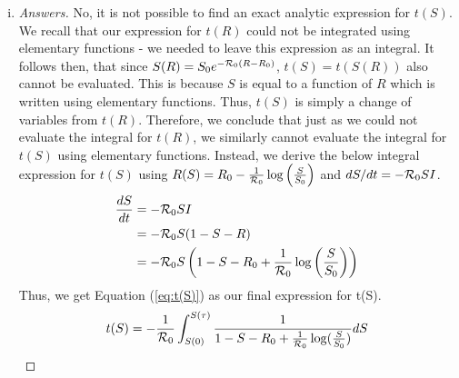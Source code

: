 \documentclass[12pt]{article}
\begin{document}
\begin{enumerate}[(a)]
\begin{enumerate}[(i)]
{\begin{proof}[Answers]
\\\\
We would not incorporate this expression in a report for a public health agency because of some key assumptions in the model that do not reflect the nature of an influenza epidemic. In particular, the temporal delay between prevalence and death is a factor we would expect to have a large impact on the inference of the time peak prevalence from mortality data, and the lack of heterogeneous age mortality structure may make our model an unreliable proxy for P\&I mortality data. This leads us to conclude that there would be large error associated with an estimate of the time of peak prevalence $t_p$ based on mortality data, and would not be useful for practical purposes.
\end{proof}
}

  \item \basicSIRanalQbiv

{\color{blue}
\begin{proof}[Answers]
No, it is not possible to find an exact analytic expression for $t(S)$. We recall that our expression for $t(R)$ could not be integrated using elementary functions - we needed to leave this expression as an integral. It follows then, that since ${S(R)} = S_0 e^{-{\cal R}_0(R-R_0)}$, $t(S) = t(S(R))$ also cannot be evaluated. This is because $S$ is equal to a function of $R$ which is written using elementary functions. Thus, $t(S)$ is simply a change of variables from $t(R)$. Therefore, we conclude that just as we could not evaluate the integral for $t(R)$, we similarly cannot evaluate the integral for $t(S)$ using elementary functions. Instead, we derive the below integral expression for $t(S)$ using $R(S)=R_0-\frac{1}{{\cal R}_0} \log \left( \frac{S}{S_0}\right)$ and $dS/dt=-{\cal R}_0SI$. 
\begin{equation}
\begin{aligned}
\frac{dS}{dt}&=-{\cal R}_0 SI\\
&=-{\cal R}_0 S(1-S-R)\\
&=-{\cal R}_0S \left( 1-S-R_0 + \frac{1}{{\cal R}_0} \log \left( \frac{S}{S_0}\right) \right)
\end{aligned}
\end{equation}
Thus, we get Equation (\ref{eq:t(S)}) as our final expression for t(S).
\begin{equation}
\label{eq:t(S)}
t(S)=-\frac{1}{{\cal R}_0}\int_{S(0)}^{S(\tau)} \frac{1}{1-S-R_0 +\frac{1}{{\cal R}_0}\log(\frac{S}{S_0})} dS
\end{equation}
\end{proof}
}


\end{enumerate}
\end{enumerate}
\end{document}
